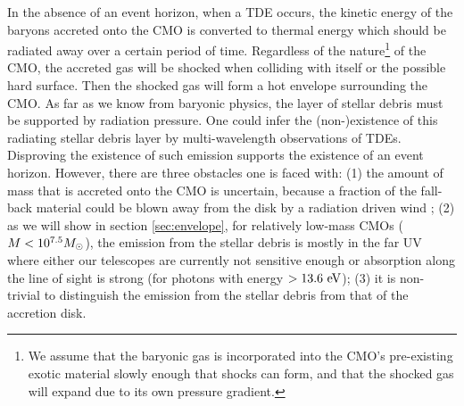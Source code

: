 \documentclass[useAMS,usenatbib]{mn2e}
\begin{document}
In the absence of an event horizon, when a TDE occurs, the kinetic
energy of the baryons accreted onto the CMO is converted to thermal
energy which should be radiated away over a certain period of
time. Regardless of the nature\footnote{We 
  assume that the baryonic gas is incorporated into the CMO's 
pre-existing exotic material slowly enough that shocks can form, and
that the shocked gas will expand due to its own pressure gradient.} of
the CMO, the 
accreted gas will be shocked when colliding with itself or the
possible hard surface. Then the shocked gas will form a hot envelope
surrounding the CMO. As far as we know from baryonic physics, the 
layer of stellar debris must  
be supported by radiation pressure. One could infer the (non-)existence
of this radiating stellar debris layer by multi-wavelength observations of
TDEs. Disproving the existence of such emission supports
the existence of an event horizon. However, there are three obstacles
one is faced with: (1) the amount of mass that is accreted onto the CMO
is uncertain, because a fraction of the fall-back material could be
blown away from the disk by a radiation driven wind
\citep[e.g.][]{2016MNRAS.461..948M}; (2) as we will show in section
\ref{sec:envelope}, 
for relatively low-mass CMOs ($M< 10^{7.5}M_{\rm\odot}$), the
emission from the stellar debris is mostly in the far UV where either our telescopes are 
currently not sensitive enough or absorption along the line of sight
is strong (for photons with energy $>13.6\rm\ eV$); (3) it is
non-trivial to distinguish the 
emission from the stellar debris from that of the accretion disk.
\end{document}
